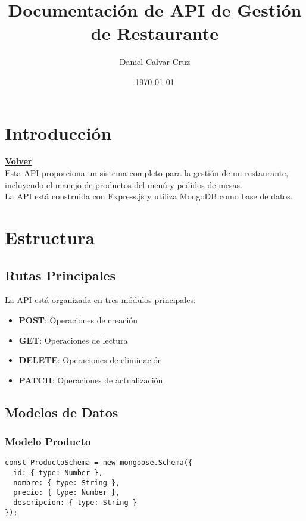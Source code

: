 \documentclass[12pt]{article}
\title{Documentación de API de Gestión de Restaurante}
\author{Daniel Calvar Cruz}
\date{\today}
\begin{document}
\maketitle

\tableofcontents
\newpage

\section{Introducción}
\hyperlink{anchor-indice}{\textbf{Volver}}\\

Esta API proporciona un sistema completo para la gestión de un restaurante, incluyendo el manejo de productos del menú y pedidos de mesas.\\

La API está construida con Express.js y utiliza MongoDB como base de datos.

\section{Estructura}

\subsection{Rutas Principales}
La API está organizada en tres módulos principales:

\begin{itemize}
    \item \textbf{POST}: Operaciones de creación
    \item \textbf{GET}: Operaciones de lectura
    \item \textbf{DELETE}: Operaciones de eliminación
    \item \textbf{PATCH}: Operaciones de actualización
\end{itemize}

\subsection{Modelos de Datos}

\subsubsection{Modelo Producto}
\begin{verbatim}
const ProductoSchema = new mongoose.Schema({
  id: { type: Number },
  nombre: { type: String },
  precio: { type: Number },
  descripcion: { type: String }
});
\end{verbatim}
\end{document}

